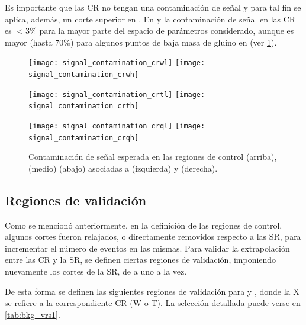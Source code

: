 
Es importante que las CR no tengan una contaminación de señal y para tal fin se
aplica, además, un corte superior en {\met}. En {\CRW} y {\CRT} la contaminación
de señal en las CR es $<3\%$ para la mayor parte del espacio de parámetros
considerado, aunque es mayor (hasta 70\%) para algunos puntos de baja masa de
gluino en {\CRTL} (ver \cref{fig:bkg_cr_contamination}).

\begin{figure}[!htbp]
  \centering

  \texttt{[image: signal\_contamination\_crwl]}\hspace{1cm}
  \texttt{[image: signal\_contamination\_crwh]}

  \texttt{[image: signal\_contamination\_crtl]}\hspace{1cm}
  \texttt{[image: signal\_contamination\_crth]}

  \texttt{[image: signal\_contamination\_crql]}\hspace{1cm}
  \texttt{[image: signal\_contamination\_crqh]}


  \caption{Contaminación de señal esperada en las regiones de control {\CRW} (arriba),
    {\CRT} (medio) {\CRQ} (abajo) asociadas a {\SRL} (izquierda) y {\SRH} (derecha).}
  \label{fig:bkg_cr_contamination}
\end{figure}



\subsection{Regiones de validación}

Como se mencionó anteriormente, en la definición de las regiones de control,
algunos cortes fueron relajados, o directamente removidos respecto a las SR,
para incrementar el número de eventos en las mismas. Para validar la
extrapolación entre las CR y la SR, se definen ciertas regiones de validación,
imponiendo nuevamente los cortes de la SR, de a uno a la vez.

De esta forma se definen las siguientes regiones de validación para {\CRW} y
{\CRT}, donde la X se refiere a la correspondiente CR (W o T). La selección
detallada puede verse en \cref{tab:bkg_vrs1}.

